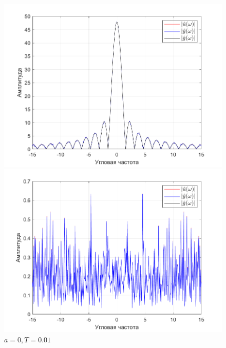 \documentclass[a4paper]{article}
\begin{document}
\begin{figure}[H]
    \begin{minipage}{0.5\textwidth}
        \centering
        \includegraphics[width=\linewidth]{ex1_1/a=-3_T=0.01/h3.png}
        \caption{$a = -3, T = 0.01$}
    \end{minipage}
    \begin{minipage}{0.5\textwidth}
        \centering
        \includegraphics[width=\linewidth]{ex1_1/a=0_T=0.01/h3.png}
        \caption{$a = 0, T = 0.01$}
    \end{minipage}
\end{figure}
\end{document}
